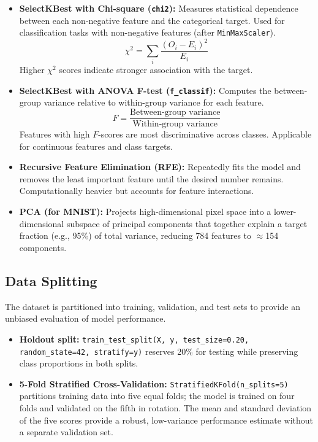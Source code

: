 \documentclass[12pt,a4paper]{article}
\begin{document}
\begin{itemize}[noitemsep]
  \item \textbf{SelectKBest with Chi-square (\texttt{chi2}):} Measures statistical dependence
        between each non-negative feature and the categorical target. Used for classification
        tasks with non-negative features (after \texttt{MinMaxScaler}).
        \[
          \chi^2 = \sum_{i} \frac{(O_i - E_i)^2}{E_i}
        \]
        Higher $\chi^2$ scores indicate stronger association with the target.
  \item \textbf{SelectKBest with ANOVA F-test (\texttt{f\_classif}):} Computes the
        between-group variance relative to within-group variance for each feature.
        \[
          F = \frac{\text{Between-group variance}}{\text{Within-group variance}}
        \]
        Features with high $F$-scores are most discriminative across classes.
        Applicable for continuous features and class targets.
  \item \textbf{Recursive Feature Elimination (RFE):} Repeatedly fits the model and removes
        the least important feature until the desired number remains. Computationally heavier
        but accounts for feature interactions.
  \item \textbf{PCA (for MNIST):} Projects high-dimensional pixel space into a lower-dimensional
        subspace of principal components that together explain a target fraction (e.g., 95\%)
        of total variance, reducing 784 features to $\approx$154 components.
\end{itemize}

\subsection{Data Splitting}

The dataset is partitioned into training, validation, and test sets to provide an unbiased
evaluation of model performance.

\begin{itemize}[noitemsep]
  \item \textbf{Holdout split:} \texttt{train\_test\_split(X, y, test\_size=0.20,
        random\_state=42, stratify=y)} reserves 20\% for testing while preserving class
        proportions in both splits.
  \item \textbf{5-Fold Stratified Cross-Validation:} \texttt{StratifiedKFold(n\_splits=5)}
        partitions training data into five equal folds; the model is trained on four folds
        and validated on the fifth in rotation. The mean and standard deviation of the five
        scores provide a robust, low-variance performance estimate without a separate
        validation set.
\end{itemize}
\end{document}
